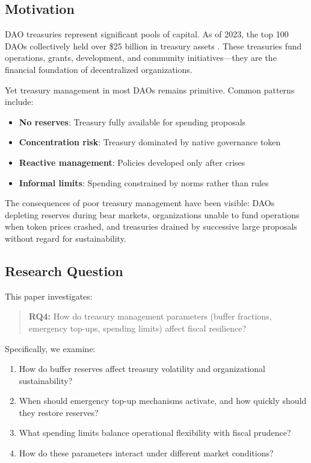 
\subsection{Motivation}

DAO treasuries represent significant pools of capital. As of 2023, the top 100 DAOs collectively held over \$25 billion in treasury assets \citep{deepdao2023analytics}. These treasuries fund operations, grants, development, and community initiatives---they are the financial foundation of decentralized organizations.

Yet treasury management in most DAOs remains primitive. Common patterns include:
\begin{itemize}
    \item \textbf{No reserves}: Treasury fully available for spending proposals
    \item \textbf{Concentration risk}: Treasury dominated by native governance token
    \item \textbf{Reactive management}: Policies developed only after crises
    \item \textbf{Informal limits}: Spending constrained by norms rather than rules
\end{itemize}

The consequences of poor treasury management have been visible: DAOs depleting reserves during bear markets, organizations unable to fund operations when token prices crashed, and treasuries drained by successive large proposals without regard for sustainability.

\subsection{Research Question}

This paper investigates:

\begin{quote}
\textbf{RQ4:} How do treasury management parameters (buffer fractions, emergency top-ups, spending limits) affect fiscal resilience?
\end{quote}

Specifically, we examine:
\begin{enumerate}
    \item How do buffer reserves affect treasury volatility and organizational sustainability?
    \item When should emergency top-up mechanisms activate, and how quickly should they restore reserves?
    \item What spending limits balance operational flexibility with fiscal prudence?
    \item How do these parameters interact under different market conditions?
\end{enumerate}

